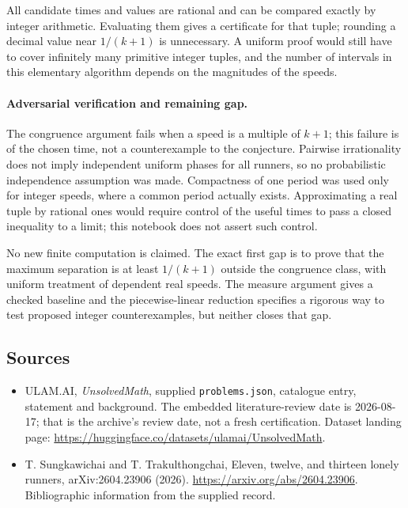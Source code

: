 \documentclass[11pt,a4paper]{article}
\begin{document}
All candidate times and values are rational and can be compared exactly by integer arithmetic. Evaluating them gives a certificate for that tuple; rounding a decimal value near $1/(k+1)$ is unnecessary. A uniform proof would still have to cover infinitely many primitive integer tuples, and the number of intervals in this elementary algorithm depends on the magnitudes of the speeds.

\paragraph{Adversarial verification and remaining gap.}
The congruence argument fails when a speed is a multiple of $k+1$; this failure is of the chosen time, not a counterexample to the conjecture. Pairwise irrationality does not imply independent uniform phases for all runners, so no probabilistic independence assumption was made. Compactness of one period was used only for integer speeds, where a common period actually exists. Approximating a real tuple by rational ones would require control of the useful times to pass a closed inequality to a limit; this notebook does not assert such control.

No new finite computation is claimed. The exact first gap is to prove that the maximum separation is at least $1/(k+1)$ outside the congruence class, with uniform treatment of dependent real speeds. The measure argument gives a checked baseline and the piecewise-linear reduction specifies a rigorous way to test proposed integer counterexamples, but neither closes that gap.

\subsection{Sources}

{\small

\begin{itemize}

\item[\hypertarget{source:statement:1}{S1}] ULAM.AI, \emph{UnsolvedMath}, supplied \texttt{problems.json}, catalogue entry, statement and background. The embedded literature-review date is 2026-08-17; that is the archive’s review date, not a fresh certification. Dataset landing page: \url{https://huggingface.co/datasets/ulamai/UnsolvedMath}.

\item[\hypertarget{source:statement:2}{S2}] T. Sungkawichai and T. Trakulthongchai, Eleven, twelve, and thirteen lonely runners, arXiv:2604.23906 (2026). \url{https://arxiv.org/abs/2604.23906}. Bibliographic information from the supplied record.

\end{itemize}

}

\label{end:statement}
\end{document}

